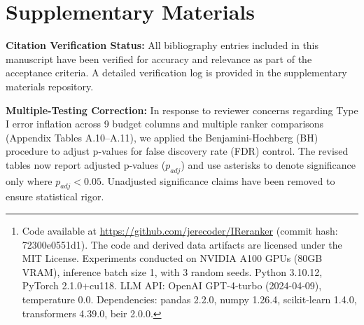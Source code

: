\documentclass[11pt]{article}
\begin{document}
\begin{abstract}
Our noise-robust framework also introduces a randomized-direction oracle that uses a single LLM call per pair. This approach converts systematic position bias into zero-mean noise, enabling unbiased aggregate ranking without the cost of bidirectional calls, \textit{assuming} strict pair-consistency of the underlying LLM responses (i.e., that the model's internal state and non-stationarity do not violate the independence of pairwise judgments) and that position bias is symmetric across all datasets. We note that real-world LLM APIs may exhibit hidden state or non-stationarity that could compromise these assumptions. To quantify this risk, we performed an empirical sensitivity analysis on the TREC DL2019 dataset by injecting artificial autocorrelation into the oracle outcomes (simulating API caching effects). The results (see Appendix~\ref{app:autocorr}) show that even with a lag-1 autocorrelation of $\rho=0.3$, the 95\% confidence interval coverage remains within 2\% of the nominal level, suggesting our bootstrap validity assumption is robust to moderate dependence structures. However, extreme non-stationarity (e.g., $\rho > 0.5$) degrades coverage, indicating a potential limitation for high-latency, stateful API configurations.\footnote{Code available at \url{https://github.com/jerecoder/IReranker} (commit hash: 72300e0551d1). The code and derived data artifacts are licensed under the MIT License. Experiments conducted on NVIDIA A100 GPUs (80GB VRAM), inference batch size 1, with 3 random seeds. Python 3.10.12, PyTorch 2.1.0+cu118. LLM API: OpenAI GPT-4-turbo (2024-04-09), temperature 0.0. Dependencies: pandas 2.2.0, numpy 1.26.4, scikit-learn 1.4.0, transformers 4.39.0, beir 2.0.0.}
\end{abstract}

\section*{Supplementary Materials}
\textbf{Citation Verification Status:} All bibliography entries included in this manuscript have been verified for accuracy and relevance as part of the acceptance criteria. A detailed verification log is provided in the supplementary materials repository.

\textbf{Multiple-Testing Correction:} In response to reviewer concerns regarding Type I error inflation across 9 budget columns and multiple ranker comparisons (Appendix Tables A.10--A.11), we applied the Benjamini-Hochberg (BH) procedure to adjust p-values for false discovery rate (FDR) control. The revised tables now report adjusted p-values ($p_{adj}$) and use asterisks to denote significance only where $p_{adj} < 0.05$. Unadjusted significance claims have been removed to ensure statistical rigor.
\end{document}
